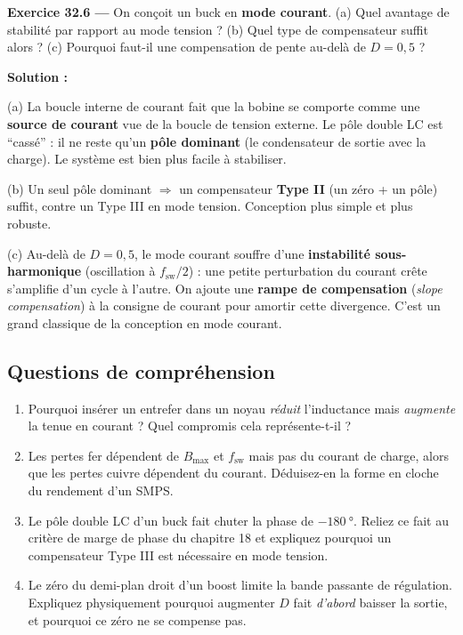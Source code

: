 \documentclass[12pt,a4paper,twoside]{book}
\begin{document}
\textbf{Exercice 32.6 ---} On conçoit un buck en \textbf{mode courant}. (a) Quel avantage de stabilité par rapport au mode tension ? (b) Quel type de compensateur suffit alors ? (c) Pourquoi faut-il une compensation de pente au-delà de $D = 0{,}5$ ?

\begin{pratique}
\textbf{Solution :}

(a) La boucle interne de courant fait que la bobine se comporte comme une \textbf{source de courant} vue de la boucle de tension externe. Le pôle double LC est ``cassé'' : il ne reste qu'un \textbf{pôle dominant} (le condensateur de sortie avec la charge). Le système est bien plus facile à stabiliser.

(b) Un seul pôle dominant $\Rightarrow$ un compensateur \textbf{Type II} (un zéro + un pôle) suffit, contre un Type III en mode tension. Conception plus simple et plus robuste.

(c) Au-delà de $D = 0{,}5$, le mode courant souffre d'une \textbf{instabilité sous-harmonique} (oscillation à $f_{\text{sw}}/2$) : une petite perturbation du courant crête s'amplifie d'un cycle à l'autre. On ajoute une \textbf{rampe de compensation} (\textit{slope compensation}) à la consigne de courant pour amortir cette divergence. C'est un grand classique de la conception en mode courant.
\end{pratique}

\subsection*{Questions de compréhension}

\begin{enumerate}[nosep]
\item Pourquoi insérer un entrefer dans un noyau \textit{réduit} l'inductance mais \textit{augmente} la tenue en courant ? Quel compromis cela représente-t-il ?
\item Les pertes fer dépendent de $B_{\max}$ et $f_{\text{sw}}$ mais pas du courant de charge, alors que les pertes cuivre dépendent du courant. Déduisez-en la forme en cloche du rendement d'un SMPS.
\item Le pôle double LC d'un buck fait chuter la phase de $-\SI{180}{°}$. Reliez ce fait au critère de marge de phase du chapitre 18 et expliquez pourquoi un compensateur Type III est nécessaire en mode tension.
\item Le zéro du demi-plan droit d'un boost limite la bande passante de régulation. Expliquez physiquement pourquoi augmenter $D$ fait \textit{d'abord} baisser la sortie, et pourquoi ce zéro ne se compense pas.
\end{enumerate}
\end{document}
